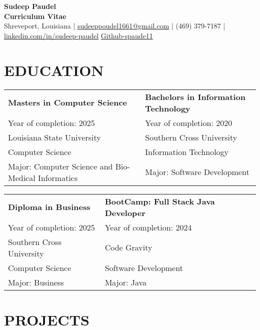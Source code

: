 \documentclass[a4paper,9pt]{article}
\begin{document}
\pagestyle{empty}

\begin{center}
\textbf{\Large Sudeep Paudel}\\[3pt] %
\textbf{Curriculum Vitae}\\[1pt] %
Shreveport, Louisiana | \href{mailto:sudeeppoudel1661@gmail.com}{sudeeppoudel1661@gmail.com} |
(469) 379-7187 | \href{https://www.linkedin.com/in/sudeep-paudel-4853ab28b/}{linkedin.com/in/sudeep-paudel} \href{https://github.com/spaude11}{Github-spaude11}
\end{center}


\section*{EDUCATION}

\noindent
\begin{tabular}{@{}p{} p{}@{}}
\textbf{Masters in Computer Science} & \textbf{Bachelors in Information Technology} \\
Year of completion: 2025 & Year of completion: 2020 \\
Louisiana State University & Southern Cross University \\
Computer Science & Information Technology \\
Major: Computer Science and Bio-Medical Informatics & Major: Software Development \\
\end{tabular}

\noindent
\begin{tabular}{@{}p{} p{}@{}}
\textbf{Diploma in Business} & \textbf{BootCamp: Full Stack Java Developer} \\
Year of completion: 2025 & Year of completion: 2024 \\
Southern Cross University & Code Gravity \\
Computer Science & Software Development  \\
Major: Business & Major: Java  \\
\end{tabular}
\noindent


\section*{PROJECTS}
\end{document}
